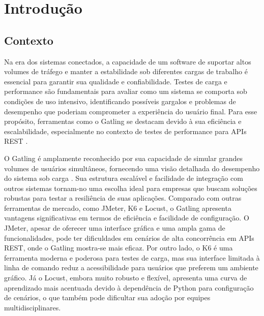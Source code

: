 \documentclass[
	12pt,
	openright,
	twoside,
	a4paper,
	english,
	brazil
	]{abntex2}
\begin{document}

\tableofcontents*
\cleardoublepage
\textual


\chapter{Introdução} %

\section{Contexto}
Na era dos sistemas conectados, a capacidade de um software de suportar altos volumes de tráfego e manter a estabilidade sob diferentes cargas de trabalho é essencial para garantir sua qualidade e confiabilidade. Testes de carga e performance são fundamentais para avaliar como um sistema se comporta sob condições de uso intensivo, identificando possíveis gargalos e problemas de desempenho que poderiam comprometer a experiência do usuário final. Para esse propósito, ferramentas como o Gatling se destacam devido à sua eficiência e escalabilidade, especialmente no contexto de testes de performance para APIs REST \cite{Banias}.

O Gatling é amplamente reconhecido por sua capacidade de simular grandes volumes de usuários simultâneos, fornecendo uma visão detalhada do desempenho do sistema sob carga \cite{Cazzola}. Sua estrutura escalável e facilidade de integração com outros sistemas tornam-no uma escolha ideal para empresas que buscam soluções robustas para testar a resiliência de suas aplicações. Comparado com outras ferramentas de mercado, como JMeter, K6 e Locust, o Gatling apresenta vantagens significativas em termos de eficiência e facilidade de configuração. O JMeter, apesar de oferecer uma interface gráfica e uma ampla gama de funcionalidades, pode ter dificuldades em cenários de alta concorrência em APIs REST, onde o Gatling mostra-se mais eficaz. Por outro lado, o K6 é uma ferramenta moderna e poderosa para testes de carga, mas sua interface limitada à linha de comando reduz a acessibilidade para usuários que preferem um ambiente gráfico. Já o Locust, embora muito robusto e flexível, apresenta uma curva de aprendizado mais acentuada devido à dependência de Python para configuração de cenários, o que também pode dificultar sua adoção por equipes multidisciplinares.
\end{document}
